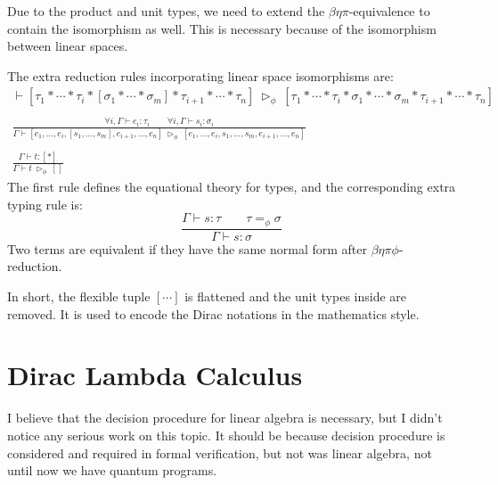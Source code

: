 Due to the product and unit types, we need to extend the $\beta\eta\pi$-equivalence to contain the isomorphism as well. This is necessary because of the isomorphism between linear spaces.
\begin{definition}
  \label{def:STLC_flexible_tuple_red}
  The extra reduction rules incorporating linear space isomorphisms are:
  \begin{gather*}
      \vdash [\tau_1 * \cdots * \tau_i * [\sigma_1 * \cdots * \sigma_m] * \tau_{i+1} * \cdots * \tau_n] \ \triangleright_\phi\ [\tau_1 * \cdots * \tau_i * \sigma_1 * \cdots * \sigma_m * \tau_{i+1} * \cdots * \tau_n]\\
      \ \\        
      \frac{\forall i, \Gamma \vdash e_i : \tau_i \qquad \forall i, \Gamma \vdash s_i : \sigma_i}{\Gamma \vdash [e_1, \dots, e_i, [s_1, \dots, s_m], e_{i+1}, \dots, e_n] \ \triangleright_\phi\ [e_1, \dots, e_i, s_1, \dots, s_m, e_{i+1}, \dots, e_n]}\\
      \ \\
      \frac{\Gamma \vdash t : [*]}{\Gamma \vdash t\ \triangleright_\phi\ []}
  \end{gather*}
  The first rule defines the equational theory for types, and the corresponding extra typing rule is:
  $$
  \frac{\Gamma \vdash s : \tau\qquad \tau =_\phi \sigma}{\Gamma \vdash s : \sigma}
  $$
  Two terms are equivalent if they have the same normal form after $\beta\eta\pi\phi$-reduction.
\end{definition}

In short, the flexible tuple $[\cdots]$ is flattened and the unit types inside are removed. It is used to encode the Dirac notations in the mathematics style.


\section{Dirac Lambda Calculus}


I believe that the decision procedure for linear algebra is necessary, but I didn't notice any serious work on this topic. It should be because decision procedure is considered and required in formal verification, but not was linear algebra, not until now we have quantum programs. 


